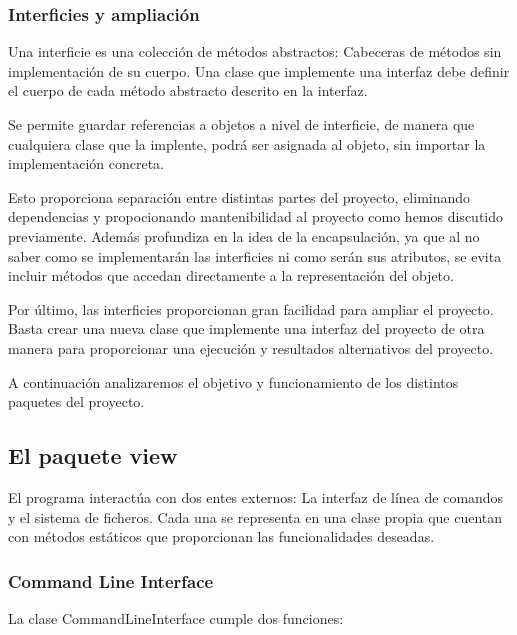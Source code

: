 \documentclass[12pt,a4paper,openright,oneside]{article}
\numberwithin{equation}{section}
\theoremstyle{definition}
\begin{document}
\subsubsection{Interficies y ampliación}
Una interficie es una colección de métodos abstractos: Cabeceras de métodos sin implementación de su cuerpo. Una clase que implemente una interfaz debe definir el cuerpo de cada método abstracto descrito en la interfaz.

Se permite guardar referencias a objetos a nivel de interficie, de manera que cualquiera clase que la implente, podrá ser asignada al objeto, sin importar la implementación concreta. 

Esto proporciona separación entre distintas partes del proyecto, eliminando dependencias y propocionando mantenibilidad al proyecto como hemos discutido previamente. Además profundiza en la idea de la encapsulación, ya que al no saber como se implementarán las interficies ni como serán sus atributos, se evita incluir métodos que accedan directamente a la representación del objeto.

Por último, las interficies proporcionan gran facilidad para ampliar el proyecto. Basta crear una nueva clase que implemente una interfaz del proyecto de otra manera para proporcionar una ejecución y resultados alternativos del proyecto.

A continuación analizaremos el objetivo y funcionamiento de los distintos paquetes del proyecto.

\subsection{El paquete view}
El programa interactúa con dos entes externos: La interfaz de línea de comandos y el sistema de ficheros. Cada una se representa en una clase propia que cuentan con métodos estáticos que proporcionan las funcionalidades deseadas. 

\subsubsection{Command Line Interface}
La clase CommandLineInterface cumple dos funciones:
\end{document}
